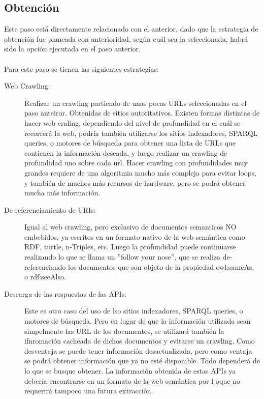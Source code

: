 \subsection{Obtención}

Este paso está directamente relacionado con el anterior, dado que la estrategia de obtención fue planeada con anterioridad, según 
cuál sea la seleccionada, habrá sido la opción ejecutada en el paso anterior.
\\\\
Para este paso se tienen las siguientes estrategias:
\begin{description}
\item[Web Crawling:] Realizar un crawling partiendo de unas pocas URLs seleccionadas en el paso anteiror. Obtenidas de sitios autoritativos.
Existen formas distintas de hacer web craling, dependiendo del nivel de profundidad en el cuál se recorrerá la web, podría también utilizarse los 
sitios indexadores, SPARQL queries, o motores de búsqueda para obtener una lista de URLs que contienen la información deseada, y luego realizar un crawling de profundidad uno sobre cada url.
Hacer crawling con profundidades muy grandes requiere de una algoritmia mucho más compleja para evitar loops, y también de muchos más recursos de hardware, pero se podrá obtener mucha más información.

\item[De-referenciamiento de URIs:] Igual al web crawling, pero exclusivo de documentos semanticos NO embebidos, ya escritos en un formato nativo de la web semántica como RDF, turtle, n-Triples, etc.
Luego la profundidad puede continuarse realizando lo que se llama un ''follow your nose'', que se realiza de-referenciando los documentos que son objeto de la propiedad owl:sameAs, o rdf:seeAlso.

\item[Descarga de las respuestas de las APIs:] Este es otro caso del uso de lso sitios indexadores, SPARQL queries, o motores de búsqueda. Pero en lugar de 
que la información  utilizada sean simpelmente las URL de los documentos, se utilizará también la ifnromación cacheada de dichos documentos y evitarse un crawling.
Como desventaja se puede tener información desactualizada, pero como ventaja se podrá obtener información que ya no esté disponible. Todo dependerá de lo que se busque obtener.
La información obtenida de estas APIs ya debería encontrarse en un formato de la web semántica por l oque no requerirá tampoco una futura extracción.


\end{description}
